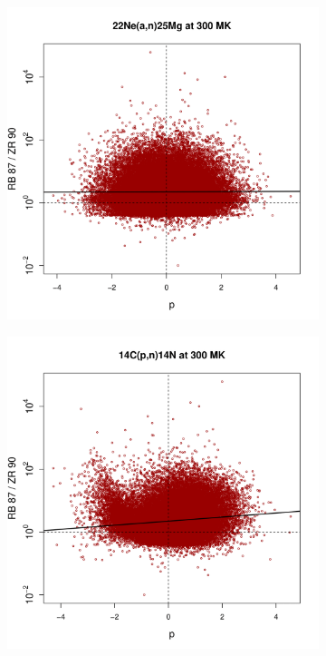 \begin{figure}[!p]
\begin{subfigure}[b]{0.495\textwidth}
\includegraphics[width=\textwidth]{Chapter-3/figs/CorrRB87ZR90_22Ne_a_n_25Mg_300MK.png}
\end{subfigure}
\begin{subfigure}[b]{0.495\textwidth}   
\centering 
\includegraphics[width=\textwidth]{Chapter-3/figs/CorrRB87ZR90_14C_p_n_14N_300MK.png}

\end{subfigure}
\end{figure}
